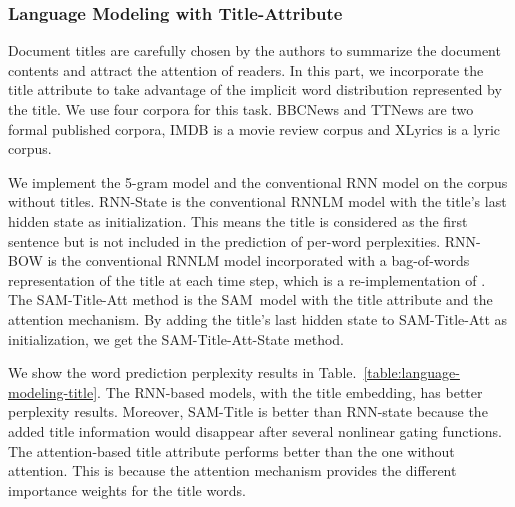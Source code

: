 \documentclass[a4paper]{article}
\newcommand{\method}{\xspace{SAM}}
\begin{document}
\subsubsection{Language Modeling with Title-Attribute}
Document titles are carefully chosen by the authors to summarize the document contents and attract the attention of readers. In this part, we incorporate the title attribute to take advantage of the implicit word distribution represented by the title. We use four corpora for this task. BBCNews and TTNews are two formal published corpora, IMDB is a movie review corpus and XLyrics is a lyric corpus.


 We implement the 5-gram model and the conventional RNN model on the corpus without titles. RNN-State is the conventional RNNLM model with the title's last hidden state as initialization. This means the title is considered as the first sentence but is not included in the prediction of per-word perplexities. RNN-BOW is the conventional RNNLM model incorporated with a bag-of-words representation of the title at each time step, which is a re-implementation of \cite{hoang2016incorporating}.  The \method-Title-Att method is the \method~model with the title attribute and the attention mechanism. By adding the title's last hidden state to \method-Title-Att as initialization, we get the \method-Title-Att-State method.


We show the word prediction perplexity results in Table.~\ref{table:language-modeling-title}.
The RNN-based models, with the title embedding, has better perplexity results. Moreover, \method-Title is better than RNN-state
because the added title information would disappear after several nonlinear gating functions.
The attention-based title attribute performs better than the one without attention. This is because the attention mechanism provides the different importance weights for the title words.
\end{document}
